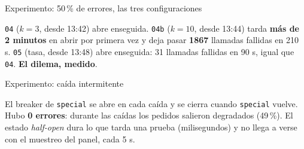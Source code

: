 \documentclass[institutional,screen,none]{ua-engineering-v6-beamer}
\begin{document}
\begin{frame}{Experimento: 50\,\% de errores, las tres configuraciones}

{\footnotesize \texttt{04} ($k = 3$, desde 13:42) abre enseguida. \texttt{04b} ($k = 10$, desde 13:44) tarda \textbf{más de 2 minutos} en abrir por primera vez y deja pasar \textbf{1867} llamadas fallidas en 210 s. \texttt{05} (tasa, desde 13:48) abre enseguida: 31 llamadas fallidas en 90 s, igual que \texttt{04}. \textbf{El dilema, medido}.}
\end{frame}

\begin{frame}{Experimento: caída intermitente}

{\footnotesize El breaker de \texttt{special} se abre en cada caída y se cierra cuando \texttt{special} vuelve. Hubo \textbf{0 errores}: durante las caídas los pedidos salieron degradados (49\,\%). El estado \emph{half-open} dura lo que tarda una prueba (milisegundos) y no llega a verse con el muestreo del panel, cada 5 s.}
\end{frame}

\end{document}
